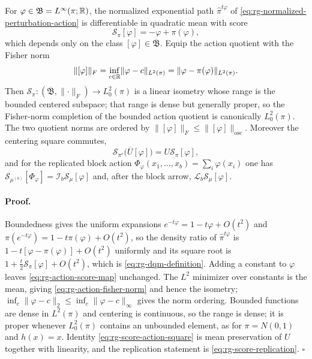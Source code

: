 For \(\varphi\in\mathfrak B=L^\infty(\pi;\mathbb R)\), the normalized exponential path
\(\widehat\pi^{t\varphi}\) of
\eqref{eq:rg-normalized-perturbation-action} is differentiable in quadratic mean
with score
\begin{equation}
 \mathscr S_\pi[\varphi]=-\varphi+\pi(\varphi),
 \label{eq:rg-action-score-map}
\end{equation}
which depends only on the class \([\varphi]\in\overline{\mathfrak B}\).  Equip
the action quotient with the Fisher norm
\begin{equation}
 \lVert[\varphi]\rVert_F
 =\inf_{c\in\mathbb R}\lVert\varphi-c\rVert_{L^2(\pi)}
 =\lVert\varphi-\pi(\varphi)\rVert_{L^2(\pi)}.
 \label{eq:rg-action-fisher-norm}
\end{equation}
Then \(\mathscr S_\pi:(\overline{\mathfrak B},\lVert\cdot\rVert_F)\to L^2_0(\pi)\)
is a linear isometry whose range is the bounded centered subspace; that range is
dense but generally proper, so the Fisher-norm completion of the bounded action
quotient is canonically \(L^2_0(\pi)\).  The two quotient norms are ordered by
\(\lVert[\varphi]\rVert_F\leq\lVert[\varphi]\rVert_{\mathrm{osc}}\).  Moreover
the centering square commutes,
\begin{equation}
 \mathscr S_{\pi^c}\bigl(\overline U[\varphi]\bigr)
 =U\mathscr S_\pi[\varphi],
 \label{eq:rg-score-action-square}
\end{equation}
and for the replicated block action
\(\Phi_\varphi(x_1,\dots,x_b)=\sum_i\varphi(x_i)\) one has
\(\mathscr S_{\mu^{(b)}}[\Phi_\varphi]=\mathscr I_b\mathscr S_\mu[\varphi]\) and,
after the block arrow, \(\mathscr L_b\mathscr S_\mu[\varphi]\).

\paragraph{Proof.}
Boundedness gives the uniform expansions \(e^{-t\varphi}=1-t\varphi+O(t^2)\) and
\(\pi(e^{-t\varphi})=1-t\pi(\varphi)+O(t^2)\), so the density ratio of
\(\widehat\pi^{t\varphi}\) is \(1-t[\varphi-\pi(\varphi)]+O(t^2)\) uniformly and
its square root is \(1+\tfrac t2\mathscr S_\pi[\varphi]+O(t^2)\), which is
\eqref{eq:rg-dqm-definition}.  Adding a constant to \(\varphi\) leaves
\eqref{eq:rg-action-score-map} unchanged.  The \(L^2\) minimizer over constants
is the mean, giving \eqref{eq:rg-action-fisher-norm} and hence the isometry;
\(\inf_c\lVert\varphi-c\rVert_2\leq\inf_c\lVert\varphi-c\rVert_\infty\) gives the
norm ordering.  Bounded functions are dense in \(L^2(\pi)\) and centering is
continuous, so the range is dense; it is proper whenever \(L^2_0(\pi)\) contains
an unbounded element, as for \(\pi=N(0,1)\) and \(h(x)=x\).  Identity
\eqref{eq:rg-score-action-square} is mean preservation of \(U\) together with
linearity, and the replication statement is
\eqref{eq:rg-score-replication}. \(\square\)

